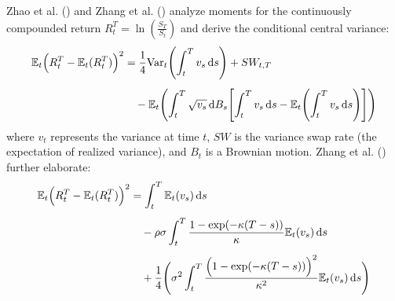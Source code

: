Zhao et al. (\citeyear{zhaoRelationPhysicalRiskneutral2013}) and Zhang et al.  (\citeyear{zhangSkewnessImpliedHeston2017}) analyze moments for the continuously compounded return $R_t^T = \ln\left(\frac{S_T}{S_t}\right)$ and derive the conditional central variance:
\begin{align}
    \mathbb{E}_t\Bigl(R_t^T-\mathbb{E}_t(R_t^T)\Bigr)^2 
    &= \frac{1}{4}\text{Var}_t\Biggl(\int_t ^T v_s\,\mathrm{d}s\Biggr) + SW_{t,T} \notag\\[1ex]
    &\quad - \mathbb{E}_t\Biggl(
        \int_t^T \sqrt{v_s}\,\mathrm{d}B_s
        \Biggl[\int_t^T v_s\,\mathrm{d}s-\mathbb{E}_t\Biggl(\int_t^T v_s\,\mathrm{d}s\Biggr)\Biggr]
    \Biggr) \notag
\end{align}    
where $v_t$ represents the variance at time $t$, $SW$ is the variance swap rate (the expectation of realized variance), and $B_t$ is a Brownian motion. Zhang et al. (\citeyear{zhangSkewnessImpliedHeston2017}) further elaborate:
\begin{align}
    \mathbb{E}_t\Bigl(R_t^T-\mathbb{E}_t(R_t^T)\Bigr)^2 &= \int_t^T \mathbb{E}_t(v_s)\,\mathrm{d}s \notag\\[1ex]
    &\quad - \rho\sigma\int_t^T \frac{1-\exp(-\kappa(T-s))}{\kappa}\mathbb{E}_t(v_s)\,\mathrm{d}s \notag\\[1ex]
    &\quad + \frac{1}{4}\Biggl(\sigma^2\int_t^T\frac{\Bigl(1-\exp(-\kappa(T-s))\Bigr)^2}{\kappa^2}\mathbb{E}_t(v_s) \,\mathrm{d}s\Biggr) \notag
\end{align}
    
